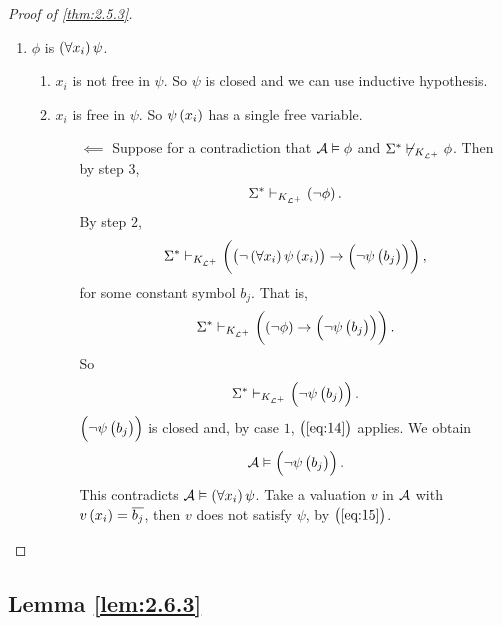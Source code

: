 \begin{proof}[Proof of \ref{thm:2.5.3}]
\begin{enumerate}[leftmargin=0.5in, label=Step \arabic*.]
\begin{itemize}
\begin{enumerate}[leftmargin=0.5in, label=Case \arabic*.]
\item $ \phi $ is $ \fab{x_i}\psi $.
\begin{enumerate}[leftmargin=0.5in, label=Case 3\alph*.]
\item $ x_i $ is not free in $ \psi $. So $ \psi $ is closed and we can use inductive hypothesis.
\item $ x_i $ is free in $ \psi $. So $ \psi\br{x_i} $ has a single free variable.
\begin{itemize}
\item[$ \impliedby $] Suppose for a contradiction that $ \AA \vDash \phi $ and $ \Sigma^* \not\vdash_{K_{\LL^+}} \phi $. Then by step $ 3 $,
$$ \Sigma^* \vdash_{K_{\LL^+}} \notb{\phi}. $$
By step $ 2 $,
$$ \Sigma^* \vdash_{K_{\LL^+}} \impb{\notb{\fab{x_i}\psi\br{x_i}}}{\notb{\psi\br{b_j}}}, $$
for some constant symbol $ b_j $. That is,
$$ \Sigma^* \vdash_{K_{\LL^+}} \impb{\notb{\phi}}{\notb{\psi\br{b_j}}}. $$
So
$$ \Sigma^* \vdash_{K_{\LL^+}} \notb{\psi\br{b_j}}. $$
$ \notb{\psi\br{b_j}} $ is closed and, by case $ 1 $, $ \br{\ref{eq:14}} $ applies. We obtain
\begin{equation}
\label{eq:15}
\AA \vDash \notb{\psi\br{b_j}}.
\end{equation}
This contradicts $ \AA \vDash \fab{x_i}\psi $. Take a valuation $ v $ in $ \AA $ with $ v\br{x_i} = \overline{b_j} $, then $ v $ does not satisfy $ \psi $, by $ \br{\ref{eq:15}} $.
\end{itemize}
\end{enumerate}
\end{enumerate}
\end{itemize}
\end{enumerate}
\end{proof}

\pagebreak

\subsection{Lemma \ref{lem:2.6.3}}

